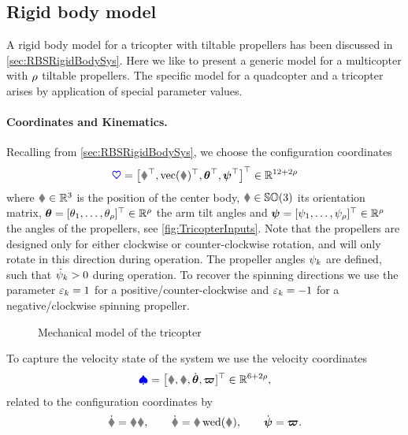 \subsection{Rigid body model}
A rigid body model for a tricopter with tiltable propellers has been discussed in \autoref{sec:RBSRigidBodySys}.
Here we like to present a generic model for a multicopter with $\numProp$ tiltable propellers.
The specific model for a quadcopter and a tricopter arises by application of special parameter values.

\paragraph{Coordinates and Kinematics.}
Recalling from \autoref{sec:RBSRigidBodySys}, we choose the configuration coordinates 
\begin{align}
 \sysCoord = \big[ \r^\top, \vectorize(\R)^\top, \tuple{\PropTilt}^\top, \tuple{\PropAngle}^\top \big]^\top \in \RealNum^{12+2\numProp}
\end{align}
where $\r \in \RealNum^3$ is the position of the center body, $\R \in \SpecialOrthogonalGroup(3)$ its orientation matrix, $\tuple{\PropTilt} = [\PropTilt[1], \ldots, \PropTilt[\numProp]]^\top \in \RealNum^{\numProp}$ the arm tilt angles and $\tuple{\PropAngle} = [\PropAngle[1],\ldots,\PropAngle[\numProp]]^\top \in \RealNum^{\numProp}$ the angles of the propellers, see \autoref{fig:TricopterInputs}.
Note that the propellers are designed only for either clockwise or counter-clockwise rotation, and will only rotate in this direction during operation.
The propeller angles $\PropAngle[k]$ are defined, such that $\PropAngled[k] > 0$ during operation.
To recover the spinning directions we use the parameter $\PropDir[k] = 1$ for a positive/counter-clockwise and $\PropDir[k] = -1$ for a negative/clockwise spinning propeller.

\begin{figure}
 \centering
 
 \caption{Mechanical model of the tricopter}
 \label{fig:TricopterInputs}
\end{figure}

To capture the velocity state of the system we use the velocity coordinates
\begin{align}
 \sysVel = \big[ \v, \w, \dot{\tuple{\PropTilt}}, \tuple{\PropVel}]^\top \in \RealNum^{6+2\numProp},
\end{align}
related to the configuration coordinates by
\begin{align}
 \rd = \R \v, 
\qquad
 \Rd = \R \wedOp(\w),
\qquad
 \dot{\tuple{\PropAngle}} = \tuple{\PropVel}.
\end{align}

